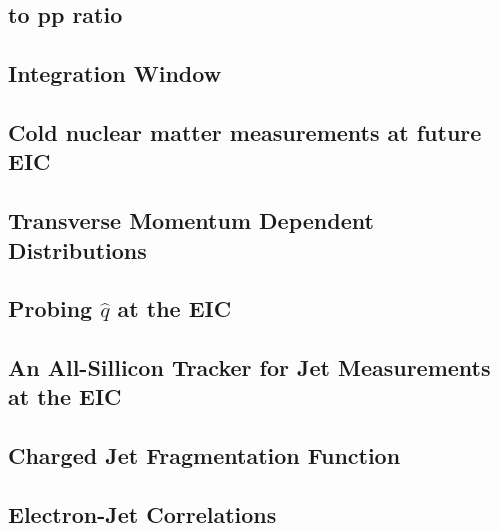 \subsection{\pPb to pp ratio}
\subsection{Integration Window}

\subsection{Cold nuclear matter measurements at future EIC}
\subsection{Transverse Momentum Dependent Distributions}
\subsection{Probing $\hat{q}$ at the EIC}
\subsection{An All-Sillicon Tracker for Jet Measurements at the EIC}
\subsection{Charged Jet Fragmentation Function}
\subsection{Electron-Jet Correlations}
\cite{Fantoni_2011}


